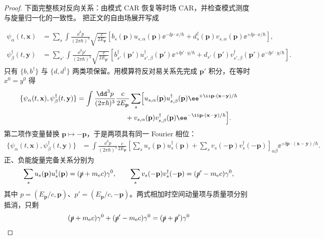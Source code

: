 \begin{proof}
下面完整核对反向关系：由模式 CAR 恢复等时场 CAR，并检查模式测度与旋量归一化的一致性。
把正文的自由场展开写成

\begin{align*}
\psi_\alpha(t,\mathbf x)
&=\sum_s\int\frac{\dd^3 p}{(2\pi\hbar)^3}
\sqrt{\frac{c}{2E_{\mathbf p}}}
\left[
 b_s(\mathbf p)u_{s,\alpha}(\mathbf p)\ee^{-\ii p\cdot x/\hbar}
 +d_s^\dagger(\mathbf p)v_{s,\alpha}(\mathbf p)\ee^{+\ii p\cdot x/\hbar}
\right],\\
\psi_\beta^\dagger(t,\mathbf y)
&=\sum_{s'}\int\frac{\dd^3 p'}{(2\pi\hbar)^3}
\sqrt{\frac{c}{2E_{\mathbf p'}}}
\left[
 b_{s'}^\dagger(\mathbf p')u_{s',\beta}^\dagger(\mathbf p')\ee^{+\ii p'\cdot y/\hbar}
 +d_{s'}(\mathbf p')v_{s',\beta}^\dagger(\mathbf p')\ee^{-\ii p'\cdot y/\hbar}
\right].
\end{align*}
只有 $\{b,b^\dagger\}$ 与 $\{d,d^\dagger\}$ 两类项保留。用模算符反对易关系先完成 $\mathbf p'$ 积分，在等时 $x^0=y^0$ 得
\begin{align*}
\{\psi_\alpha(t,\mathbf x),\psi_\beta^\dagger(t,\mathbf y)\}
&=\int\frac{\dd^3 p}{(2\pi\hbar)^3}\frac{c}{2E_{\mathbf p}}
\sum_s\Bigl[
 u_{s,\alpha}(\mathbf p)u_{s,\beta}^\dagger(\mathbf p)\ee^{+\ii\mathbf p\cdot(\mathbf x-\mathbf y)/\hbar}\\
&\hspace{7em}+v_{s,\alpha}(\mathbf p)v_{s,\beta}^\dagger(\mathbf p)\ee^{-\ii\mathbf p\cdot(\mathbf x-\mathbf y)/\hbar}
\Bigr].
\end{align*}
第二项作变量替换 $\mathbf p\mapsto-\mathbf p$，于是两项具有同一 Fourier 相位：
\begin{align*}
\{\psi_\alpha(t,\mathbf x),\psi_\beta^\dagger(t,\mathbf y)\}
&=\int\frac{\dd^3 p}{(2\pi\hbar)^3}\frac{c}{2E_{\mathbf p}}
\left[
\sum_su_s(\mathbf p)u_s^\dagger(\mathbf p)
+\sum_sv_s(-\mathbf p)v_s^\dagger(-\mathbf p)
\right]_{\alpha\beta}
 \ee^{+\ii\mathbf p\cdot(\mathbf x-\mathbf y)/\hbar}.
\end{align*}
正、负能旋量完备关系分别为
\begin{equation*}
\sum_su_s(\mathbf p)u_s^\dagger(\mathbf p)=(\slashed p+m_{\mathrm e} c)\gamma^0,
\qquad
\sum_sv_s(-\mathbf p)v_s^\dagger(-\mathbf p)=(\slashed p'-m_{\mathrm e} c)\gamma^0,
\end{equation*}
其中 $p=(E_{\mathbf p}/c,\mathbf p)$、$p'=(E_{\mathbf p}/c,-\mathbf p)$。两式相加时空间动量项与质量项分别抵消，只剩
\begin{align*}
(\slashed p+m_{\mathrm e} c)\gamma^0+(\slashed p'-m_{\mathrm e} c)\gamma^0
&=(\slashed p+\slashed p')\gamma^0\\

\end{align*}
\end{proof}
